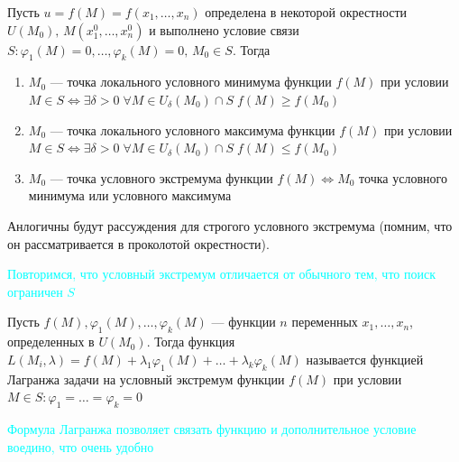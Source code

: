 \begin{Def}
    Пусть $u = f(M) = f(x_1, \dots, x_n)$ определена в некоторой окрестности $U(M_0), \, M(x^0_1, \dots, x^0_n)$ и выполнено условие связи $S : \varphi_1(M) = 0, \dots, \varphi_k(M) = 0, \, M_0 \in S$. Тогда
        \begin{enumerate}
            \item $M_0$ --- точка локального условного минимума функции $f(M)$ при условии $M \in S \Leftrightarrow \exists \delta > 0 \; \forall M \in U_\delta(M_0) \cap S \; f(M) \geqslant f(M_0)$
            
            \item $M_0$ --- точка локального условного максимума функции $f(M)$ при условии $M \in S \Leftrightarrow \exists \delta > 0 \; \forall M \in U_\delta(M_0) \cap S \; f(M) \leqslant f(M_0)$
                        
            \item $M_0$ --- точка условного экстремума функции $f(M) \Leftrightarrow M_0$ точка условного минимума или условного максимума 
        \end{enumerate}
    Анлогичны будут рассуждения для строгого условного экстремума (помним, что он рассматривается в проколотой окрестности).
\end{Def}

\textcolor{cyan}{Повторимся, что условный экстремум отличается от обычного тем, что поиск ограничен $S$}

\begin{Def}
    Пусть $f(M), \varphi_1(M), \dots, \varphi_k(M)$ --- функции $n$ переменных $x_1, \dots, x_n$, определенных в $U(M_0)$. Тогда функция $L(M_i, \lambda) = f(M) + \lambda_1 \varphi_1(M) + \dots + \lambda_k \varphi_k(M)$ называется функцией Лагранжа задачи на условный экстремум функции $f(M)$ при условии $M \in S : \varphi_1 = \dots = \varphi_k = 0$
\end{Def}
\textcolor{cyan}{Формула Лагранжа позволяет связать функцию и дополнительное условие воедино, что очень удобно}

